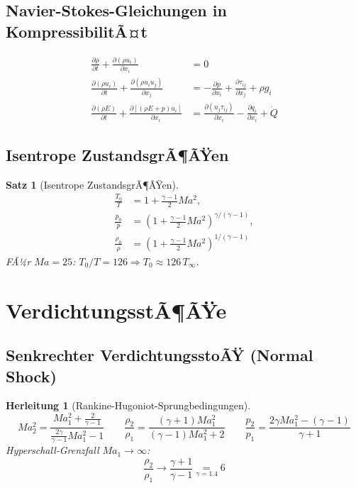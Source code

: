 ﻿\documentclass[12pt,a4paper]{article}
\newtheorem{satz}{Satz}[section]
\newtheorem{herleitung}{Herleitung}[section]
\newcommand{\Ma}{M\!a}
\begin{document}
\subsection{Navier-Stokes-Gleichungen in KompressibilitÃ¤t}

\begin{align}
  \frac{\partial \rho}{\partial t} + \frac{\partial (\rho u_i)}{\partial x_i} &= 0
  \tag{KontinuitÃ¤t}\\[4pt]
  \frac{\partial (\rho u_i)}{\partial t} + \frac{\partial (\rho u_i u_j)}{\partial x_j}
  &= -\frac{\partial p}{\partial x_i} + \frac{\partial \tau_{ij}}{\partial x_j} + \rho g_i
  \tag{Impuls}\\[4pt]
  \frac{\partial (\rho E)}{\partial t} + \frac{\partial [(\rho E + p)u_i]}{\partial x_i}
  &= \frac{\partial (u_j \tau_{ij})}{\partial x_i}
    - \frac{\partial q_i}{\partial x_i} + \dot{Q}
  \tag{Energie}
\end{align}

\subsection{Isentrope ZustandsgrÃ¶ÃŸen}

\begin{satz}[Isentrope ZustandsgrÃ¶ÃŸen]
\begin{align}
  \frac{T_0}{T} &= 1 + \frac{\gamma-1}{2}\Ma^2,\\[4pt]
  \frac{p_0}{p} &= \left(1 + \frac{\gamma-1}{2}\Ma^2\right)^{\!\gamma/(\gamma-1)},\\[4pt]
  \frac{\rho_0}{\rho} &= \left(1 + \frac{\gamma-1}{2}\Ma^2\right)^{\!1/(\gamma-1)}
\end{align}
FÃ¼r $\Ma = 25$: $T_0/T = 126 \Rightarrow T_0 \approx 126\,T_\infty$.
\end{satz}

\section{VerdichtungsstÃ¶ÃŸe}

\subsection{Senkrechter VerdichtungsstoÃŸ (Normal Shock)}

\begin{herleitung}[Rankine-Hugoniot-Sprungbedingungen]
\[
  \Ma_2^2 = \frac{\Ma_1^2 + \frac{2}{\gamma-1}}{\frac{2\gamma}{\gamma-1}\Ma_1^2 - 1}
  \qquad
  \frac{\rho_2}{\rho_1} = \frac{(\gamma+1)\Ma_1^2}{(\gamma-1)\Ma_1^2 + 2}
  \qquad
  \frac{p_2}{p_1} = \frac{2\gamma\Ma_1^2 - (\gamma-1)}{\gamma+1}
\]
Hyperschall-Grenzfall $\Ma_1 \to \infty$:
\[
  \frac{\rho_2}{\rho_1} \to \frac{\gamma+1}{\gamma-1}
    \underset{\gamma=1.4}{=} 6
\]
\end{herleitung}
\end{document}
